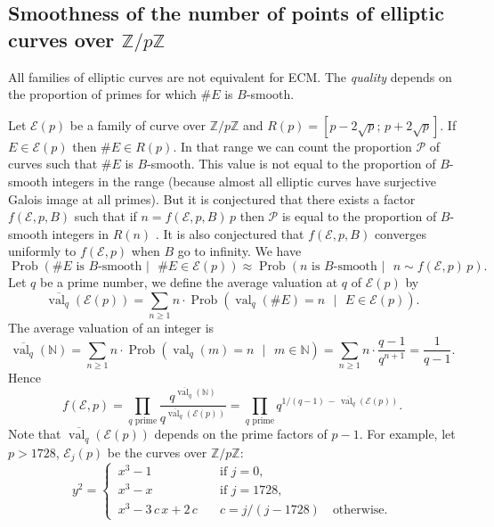 \documentclass[a4paper, 11pt, pdftex]{report}
\theoremstyle{plain}
\theoremstyle{definition}
\DeclareMathOperator{\val}{val}
\DeclareMathOperator{\Prob}{Prob}
\begin{document}
\subsection{Smoothness of the number of points of elliptic curves over $\mathbb{Z}/p\mathbb{Z}$}

All families of elliptic curves are not equivalent for ECM. The \textit{quality} depends on the
proportion of primes for which $\#E$ is $B$-smooth.

Let $\mathcal{E}(p)$ be a family of curve over $\mathbb{Z}/p\mathbb{Z}$ and
$R(p) = [p - 2\sqrt{p};\, p + 2\sqrt{p}]$. If $E \in \mathcal{E}(p)$ then $\#E \in R(p)$.
In that range we can count the proportion $\mathcal{P}$ of curves such that $\#E$ is $B$-smooth.
This value is not equal to the proportion of $B$-smooth integers in the range (because almost all
elliptic curves have surjective Galois image at all primes). But it is conjectured that there exists
a factor $f(\mathcal{E}, p, B)$ such that if $n = f(\mathcal{E}, p, B)\,p$ then $\mathcal{P}$
is equal to the proportion of $B$-smooth integers in $R(n)$ \cite[§ 5]{BarbulescuShinde1}.
It is also conjectured that $f(\mathcal{E}, p, B)$ converges uniformly to $f(\mathcal{E}, p)$
when $B$ go to infinity.
We have
$$\Prob(\#E \text{ is } B\text{-smooth } |\text{ } \#E \in \mathcal{E}(p)) \approx
 \Prob(n \text{ is } B\text{-smooth } |\text{ } n \sim f(\mathcal{E}, p)\,p).$$
Let $q$ be a prime number, we define the average valuation at $q$ of $\mathcal{E}(p)$ by
$$\overline{\val_q}(\mathcal{E}(p)) = \sum_{n \geq 1} n \cdot \Prob(\val_q(\#E) = n
 \text{ }|\text{ } E \in \mathcal{E}(p)).$$
The average valuation of an integer is
$$\overline{\val_q}(\mathbb{N})
 = \sum_{n \geq 1} n \cdot \Prob(\val_q(m) = n \text{ }|\text{ } m \in \mathbb{N})
 = \sum_{n \geq 1} n \cdot \frac{q - 1}{q^{n+1}} = \frac{1}{q - 1}.$$
Hence
$$f(\mathcal{E}, p) = \prod_{q\text{ prime}}
 \frac{q^{\overline{\val_q}(\mathbb{N})}}{q^{\overline{\val_q}(\mathcal{E}(p))}}
 = \prod_{q\text{ prime}} q^{1/(q - 1)\, -\, \overline{\val_q}(\mathcal{E}(p))}.$$
Note that $\overline{\val_q}(\mathcal{E}(p))$ depends on the prime factors of $p - 1$.
For example, let $p > 1728$, $\mathcal{E}_j(p)$ be the curves over $\mathbb{Z}/p\mathbb{Z}$:
\begin{equation*}
y^2 = \begin{cases}
\,x^3 - 1 &\quad \text{if } j = 0 \text{,}\\
\,x^3 - x &\quad \text{if } j = 1728 \text{,}\\
\,x^3 - 3\,c\,x + 2\,c &\quad c = j / (j - 1728)\quad \text{otherwise.}
\end{cases}
\end{equation*}
\end{document}
